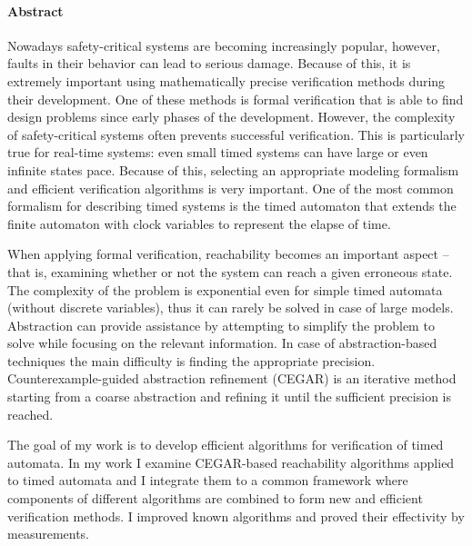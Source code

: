 \cleardoublepage

\paragraph*{Abstract}
{}
\thispagestyle{plain}

Nowadays safety-critical systems are becoming increasingly popular, however, faults in their behavior can lead to serious damage. Because of this, it is extremely important using mathematically precise verification methods during their development. One of these methods is formal verification that is able to find design problems since early phases of the development. However, the complexity of safety-critical systems often prevents successful verification. This is particularly true for real-time systems: even small timed systems can have large or even infinite states pace. Because of this, selecting an appropriate modeling formalism and efficient verification algorithms is very important. One of the most common formalism for describing timed systems is the timed automaton that extends the finite automaton with clock variables to represent the elapse of time.


When applying formal verification, reachability becomes an important aspect – that is, examining whether or not the system can reach a given erroneous state. The complexity of the problem is exponential even for simple timed automata (without discrete variables), thus it can rarely be solved in case of large models. Abstraction can provide assistance by attempting to simplify the problem to solve while focusing on the relevant information. In case of abstraction-based techniques the main difficulty is finding the appropriate precision. Counterexample-guided abstraction refinement (CEGAR) is an iterative method starting from a coarse abstraction and refining it until the sufficient precision is reached.


The goal of my work is to develop efficient algorithms for verification of timed automata. In my work I examine CEGAR-based reachability algorithms applied to timed automata and I integrate them to a common framework where components of different algorithms are combined to form new and efficient verification methods. I improved known algorithms and proved their effectivity by measurements.


